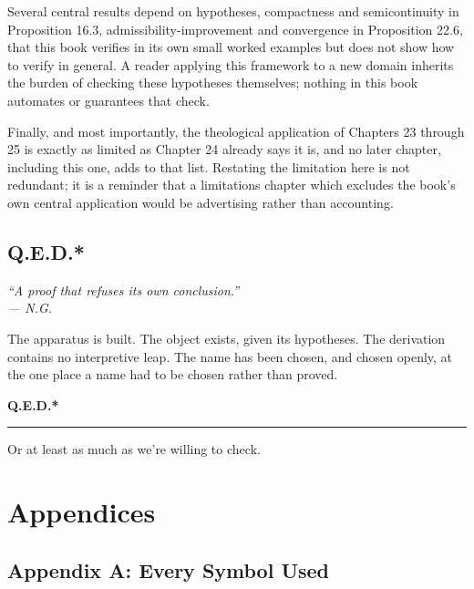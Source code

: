 \documentclass[11pt]{book}
\begin{document}
Several central results depend on hypotheses, compactness and semicontinuity in Proposition 16.3, admissibility-improvement and convergence in Proposition 22.6, that this book verifies in its own small worked examples but does not show how to verify in general. A reader applying this framework to a new domain inherits the burden of checking these hypotheses themselves; nothing in this book automates or guarantees that check.

Finally, and most importantly, the theological application of Chapters 23 through 25 is exactly as limited as Chapter 24 already says it is, and no later chapter, including this one, adds to that list. Restating the limitation here is not redundant; it is a reminder that a limitations chapter which excludes the book's own central application would be advertising rather than accounting.

\chapter{Q.E.D.*}

\begin{flushright}
\itshape ``A proof that refuses its own conclusion.''\\
\upshape --- N.G.
\end{flushright}

\bigskip

The apparatus is built. The object exists, given its hypotheses. The derivation contains no interpretive leap. The name has been chosen, and chosen openly, at the one place a name had to be chosen rather than proved.

\begin{center}
\Large \textbf{Q.E.D.*}
\end{center}

\vspace{0.5em}
\noindent\rule{4cm}{0.4pt}

\footnotesize
\noindent *Or at least as much as we're willing to check.
\normalsize

\part{Appendices}

\chapter*{Appendix A: Every Symbol Used}
\end{document}
